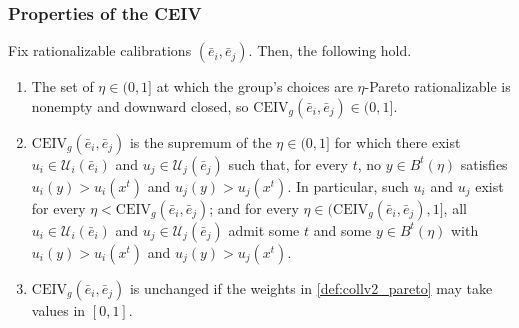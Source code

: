 \documentclass[11 pt]{article}
\begin{document}
\subsubsection{Properties of the CEIV}\label{subsec:app_collv2_pareto}

\begin{lemma}\label{lem:collv2_pareto}
Fix rationalizable calibrations $(\bar e_{i}, \bar e_{j})$. Then, the following hold.
\begin{enumerate}
\item[(i)] The set of $\eta \in (0,1]$ at which the group's choices are $\eta$-Pareto rationalizable is nonempty and downward closed, so $\mathrm{CEIV}_{g}(\bar e_{i}, \bar e_{j}) \in (0,1]$.
\item[(ii)] $\mathrm{CEIV}_{g}(\bar e_{i}, \bar e_{j})$ is the supremum of the $\eta \in (0,1]$ for which there exist $u_{i} \in \mathcal{U}_{i}(\bar e_{i})$ and $u_{j} \in \mathcal{U}_{j}(\bar e_{j})$ such that, for every $t$, no $y \in B^{t}(\eta)$ satisfies $u_{i}(y) > u_{i}(x^{t})$ and $u_{j}(y) > u_{j}(x^{t})$. In particular, such $u_{i}$ and $u_{j}$ exist for every $\eta < \mathrm{CEIV}_{g}(\bar e_{i}, \bar e_{j})$; and for every $\eta \in (\mathrm{CEIV}_{g}(\bar e_{i}, \bar e_{j}), 1]$, all $u_{i} \in \mathcal{U}_{i}(\bar e_{i})$ and $u_{j} \in \mathcal{U}_{j}(\bar e_{j})$ admit some $t$ and some $y \in B^{t}(\eta)$ with $u_{i}(y) > u_{i}(x^{t})$ and $u_{j}(y) > u_{j}(x^{t})$.
\item[(iii)] $\mathrm{CEIV}_{g}(\bar e_{i}, \bar e_{j})$ is unchanged if the weights in \autoref{def:collv2_pareto} may take values in $[0,1]$.
\end{enumerate}
\end{lemma}
\end{document}
